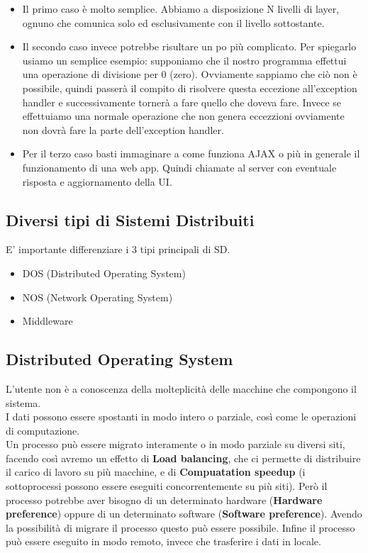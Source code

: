 \documentclass[12pt, a4paper]{article}
\begin{document}
    \begin{itemize}
        \item Il primo caso è molto semplice. Abbiamo a disposizione N livelli di layer, ognuno che comunica
        solo ed esclusivamente con il livello sottostante.
        \item Il secondo caso invece potrebbe risultare un po più complicato. Per spiegarlo usiamo un semplice esempio:
        supponiamo che il nostro programma effettui una operazione di divisione per 0 (zero).
        Ovviamente sappiamo che ciò non è possibile, quindi passerà il compito di risolvere questa eccezione
        all'exception handler e successivamente tornerà a fare quello che doveva fare.
        Invece se effettuiamo una normale operazione che non genera eccezzioni ovviamente non dovrà fare la parte dell'exception handler.
        \item Per il terzo caso basti immaginare a come funziona AJAX o più in generale il funzionamento di una web app.
        Quindi chiamate al server con eventuale risposta e aggiornamento della UI.
    \end{itemize}

    \subsection{Diversi tipi di Sistemi Distribuiti}
    E' importante differenziare i 3 tipi principali di SD.
    \begin{itemize}
        \item DOS (Distributed Operating System)
        \item NOS (Network Operating System)
        \item Middleware
    \end{itemize}  
    
    \subsection*{Distributed Operating System}
    L'utente non è a conoscenza della molteplicità delle macchine che compongono il sistema.
    \\I dati possono essere spostanti in modo intero o parziale, così come le operazioni di computazione.
    \\Un processo può essere migrato interamente o in modo parziale su diversi siti, facendo così avremo un effetto
    di \textbf{Load balancing}, che ci permette di distribuire il carico di lavoro su più macchine, 
    e di \textbf{Compuatation speedup} (i sottoprocessi possono essere eseguiti concorrentemente su più siti).
    Però il processo potrebbe aver bisogno di un determinato hardware (\textbf{Hardware preference}) oppure
    di un determinato software (\textbf{Software preference}). Avendo la possibilità di migrare il processo
    questo può essere possibile. 
    Infine il processo può essere eseguito in modo remoto, invece che trasferire i dati in locale.
    \newpage
\end{document}
